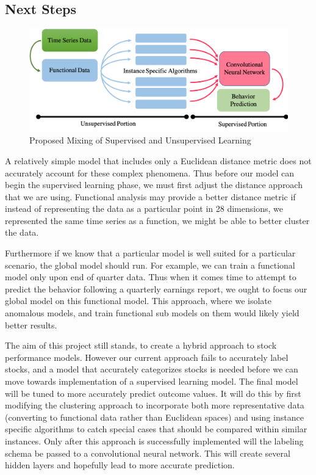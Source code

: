 \documentclass{article}
\begin{document}
\subsection{Next Steps}
\begin{figure}[h]
    \centering
    \includegraphics[width =\linewidth]{workflow.png}
    \caption{Proposed Mixing of Supervised and Unsupervised Learning}
    \label{fig:mix}
\end{figure}
A relatively simple model that includes only  a Euclidean distance metric does not accurately account for these complex phenomena.  Thus before our model can begin the supervised learning phase, we must first adjust the distance approach that we are using. Functional analysis may provide a better distance metric if instead of representing the data as a particular point in 28 dimensions, we represented the same time series as a function, we might be able to better cluster the data. 

Furthermore if we know that a particular model is well suited for a particular scenario, the global model should run. For example, we can train a functional model only upon end of quarter data. Thus when it comes time to attempt to predict the behavior following a quarterly earnings report, we ought to focus our global model on this functional model. This approach, where we isolate anomalous models, and train functional sub models on them would likely yield better results. 
	
The aim of this project still stands, to create a hybrid approach to stock performance models. However our current approach fails to accurately label stocks, and a model that accurately categorizes stocks is needed before we can move towards implementation of a supervised learning model. The final model will be tuned to more accurately predict outcome values. It will do this by first modifying the clustering approach to incorporate  both more representative data (converting to functional data rather than Euclidean spaces) and using instance specific algorithms to catch special cases that should be compared within similar instances. Only after this approach is successfully implemented will the labeling schema be passed to a convolutional neural network. This will create several hidden layers and hopefully lead to more accurate prediction. 
\end{document}
